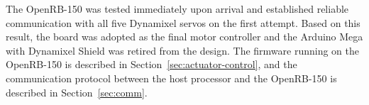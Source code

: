 The OpenRB-150 was tested immediately upon arrival and 
established reliable communication with all five Dynamixel 
servos on the first attempt. Based on this result, the board was 
adopted as the final motor controller and the Arduino Mega with 
Dynamixel Shield was retired from the design. The firmware 
running on the OpenRB-150 is described in 
Section~\ref{sec:actuator-control}, and the communication 
protocol between the host processor and the OpenRB-150 is 
described in Section~\ref{sec:comm}.
